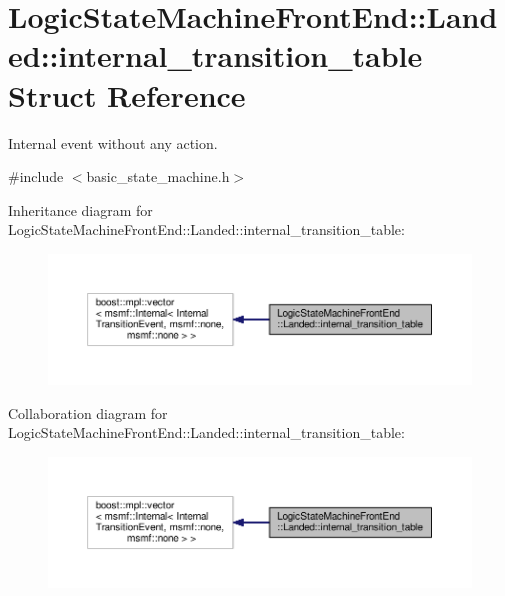 \hypertarget{structLogicStateMachineFrontEnd_1_1Landed_1_1internal__transition__table}{\section{Logic\-State\-Machine\-Front\-End\-:\-:Landed\-:\-:internal\-\_\-transition\-\_\-table Struct Reference}
\label{structLogicStateMachineFrontEnd_1_1Landed_1_1internal__transition__table}
}


Internal event without any action.  




{\ttfamily \#include $<$basic\-\_\-state\-\_\-machine.\-h$>$}



Inheritance diagram for Logic\-State\-Machine\-Front\-End\-:\-:Landed\-:\-:internal\-\_\-transition\-\_\-table\-:\nopagebreak
\begin{figure}[H]
\begin{center}
\leavevmode
\includegraphics[width=350pt]{structLogicStateMachineFrontEnd_1_1Landed_1_1internal__transition__table__inherit__graph}
\end{center}
\end{figure}


Collaboration diagram for Logic\-State\-Machine\-Front\-End\-:\-:Landed\-:\-:internal\-\_\-transition\-\_\-table\-:\nopagebreak
\begin{figure}[H]
\begin{center}
\leavevmode
\includegraphics[width=350pt]{structLogicStateMachineFrontEnd_1_1Landed_1_1internal__transition__table__coll__graph}
\end{center}
\end{figure}


